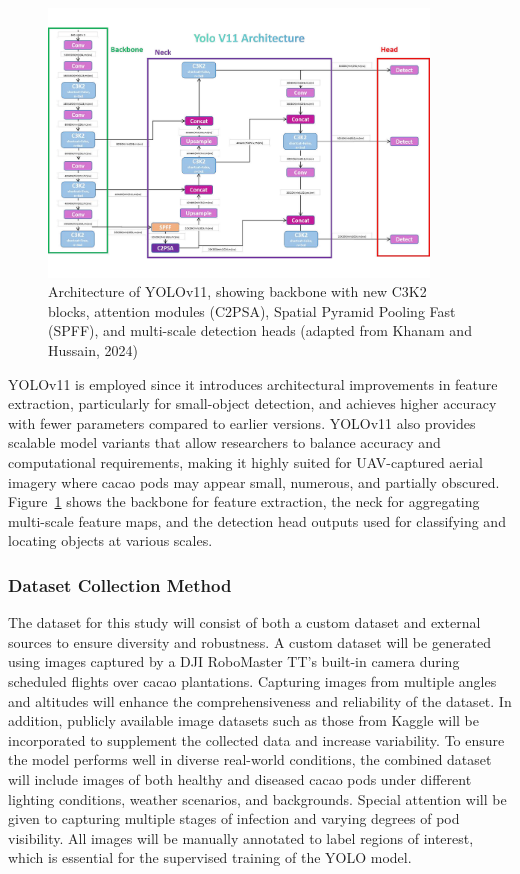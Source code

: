 \begin{figure}[H]
	\centering
	\caption{Architecture of YOLOv11, showing backbone with new C3K2 blocks, attention modules (C2PSA), Spatial Pyramid Pooling Fast (SPFF), and multi-scale detection heads (adapted from Khanam and Hussain, 2024)}
	\label{fig:yolov11_architecture}
	\includegraphics[width=0.9\textwidth]{figures/yolov11.pdf}
\end{figure}

YOLOv11 is employed since it introduces architectural improvements in feature extraction, particularly for small-object detection, and achieves higher accuracy with fewer parameters compared to earlier versions. YOLOv11 also provides scalable model variants that allow researchers to balance accuracy and computational requirements, making it highly suited for UAV-captured aerial imagery where cacao pods may appear small, numerous, and partially obscured. Figure~\ref{fig:yolov11_architecture} shows the  backbone for feature extraction, the neck for aggregating multi-scale feature maps, and the detection head outputs used for classifying and locating objects at various scales.

\subsubsection*{Dataset Collection Method}

The dataset for this study will consist of both a custom dataset and external sources to ensure diversity and robustness. A custom dataset will be generated using images captured by a DJI RoboMaster TT’s built-in camera during scheduled flights over cacao plantations. Capturing images from multiple angles and altitudes will enhance the comprehensiveness and reliability of the dataset. In addition, publicly available image datasets such as those from Kaggle will be incorporated to supplement the collected data and increase variability. To ensure the model performs well in diverse real-world conditions, the combined dataset will include images of both healthy and diseased cacao pods under different lighting conditions, weather scenarios, and backgrounds. Special attention will be given to capturing multiple stages of infection and varying degrees of pod visibility. All images will be manually annotated to label regions of interest, which is essential for the supervised training of the YOLO model.

